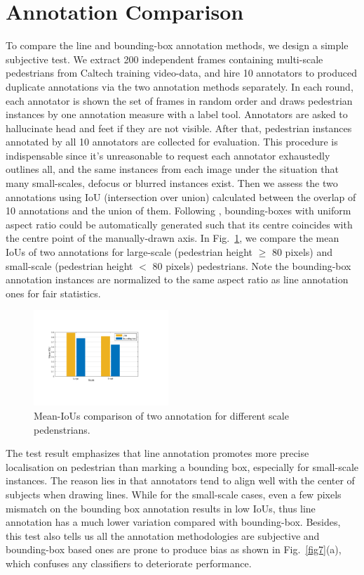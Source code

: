 \documentclass[runningheads]{llncs}
\begin{document}
\section{Annotation Comparison}\label{sec:anno_com}
To compare the line and bounding-box annotation methods, we design a simple subjective test. We extract 200 independent frames containing multi-scale pedestrians from Caltech training video-data, and hire 10 annotators to produced duplicate annotations via the two annotation methods separately. In each round, each annotator is shown the set of frames in random order and draws pedestrian instances by one annotation measure with a label tool. Annotators are asked to hallucinate head and feet if they are not visible. After that, pedestrian instances annotated by all 10 annotators are collected for evaluation. This procedure is indispensable since it's unreasonable to request each annotator exhaustedly outlines all, and the same instances from each image under the situation that many small-scales, defocus or blurred instances exist. Then we assess the two annotations using IoU (intersection over union) calculated between the overlap of 10 annotations and the union of them. Following \cite{NewCal}, bounding-boxes with uniform aspect ratio could be automatically generated such that its centre coincides with the centre point of the manually-drawn axis. In Fig.~\ref{fig2}, we compare the mean IoUs of two annotations for large-scale (pedestrian height $\geq$ 80 pixels) and small-scale (pedestrian height $<$ 80 pixels) pedestrians. Note the bounding-box annotation instances are normalized to the same aspect ratio as line annotation ones for fair statistics.
\begin{figure}[t]
	\centering
	\includegraphics[height=3.6cm]{2_annotation_copmare.pdf}
	\caption{Mean-IoUs comparison of two annotation for different scale pedenstrians.}
	\label{fig2}
\end{figure}

The test result emphasizes that line annotation promotes more precise localisation on pedestrian than marking a bounding box, especially for small-scale instances. The reason lies in that annotators tend to align well with the center of subjects when drawing lines. While for the small-scale cases, even a few pixels mismatch on the bounding box annotation results in low IoUs, thus line annotation has a much lower variation compared with bounding-box. Besides, this test also tells us all the annotation methodologies are subjective and bounding-box based ones are prone to produce bias as shown in Fig.~\ref{fig7}(a), which confuses any classifiers to deteriorate performance.
\end{document}
